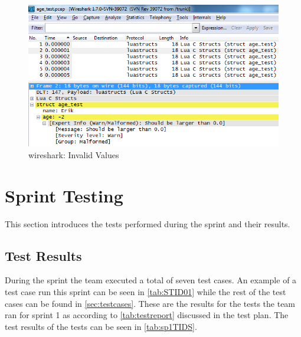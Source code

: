 \begin{figure}[htb]
	\center
	\includegraphics[width=\textwidth]{./sprints/img/wireshark_outofrange}
	\caption{\Gls{wireshark}: Invalid Values\label{fig:sp1rangerule}}
\end{figure}


\section{Sprint Testing}
\label{sec:sp1:test}
This section introduces the tests performed during the sprint and their
results.

\subsection{Test Results}
During the sprint the team executed a total of seven test cases. An example of a test case run this sprint can be seen in \autoref{tab:STID01} while the rest of the test cases can be found in \autoref{sec:testcases}. These are the results for the tests the team ran for sprint 1 as according to \autoref{tab:testreport} discussed in the test plan.
The test results of the tests can be seen in \autoref{tab:sp1TIDS}.

